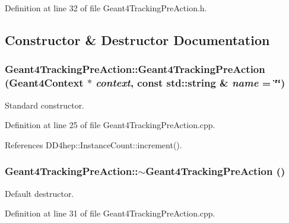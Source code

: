 Definition at line 32 of file Geant4TrackingPreAction.h.

\subsection{Constructor \& Destructor Documentation}
\hypertarget{class_d_d4hep_1_1_simulation_1_1_geant4_tracking_pre_action_a7727fa75c8c1ee2a81b105d4e8aa29a5}{
\subsubsection[{Geant4TrackingPreAction}]{\setlength{\rightskip}{0pt plus 5cm}Geant4TrackingPreAction::Geant4TrackingPreAction ({\bf Geant4Context} $\ast$ {\em context}, \/  const std::string \& {\em name} = {\ttfamily \char`\"{}\char`\"{}})}}
\label{class_d_d4hep_1_1_simulation_1_1_geant4_tracking_pre_action_a7727fa75c8c1ee2a81b105d4e8aa29a5}


Standard constructor. 

Definition at line 25 of file Geant4TrackingPreAction.cpp.

References DD4hep::InstanceCount::increment().\hypertarget{class_d_d4hep_1_1_simulation_1_1_geant4_tracking_pre_action_a47e7a397ae402a4f4d7ec9cfdb0bb143}{
\subsubsection[{$\sim$Geant4TrackingPreAction}]{\setlength{\rightskip}{0pt plus 5cm}Geant4TrackingPreAction::$\sim$Geant4TrackingPreAction ()}}
\label{class_d_d4hep_1_1_simulation_1_1_geant4_tracking_pre_action_a47e7a397ae402a4f4d7ec9cfdb0bb143}


Default destructor. 

Definition at line 31 of file Geant4TrackingPreAction.cpp.

